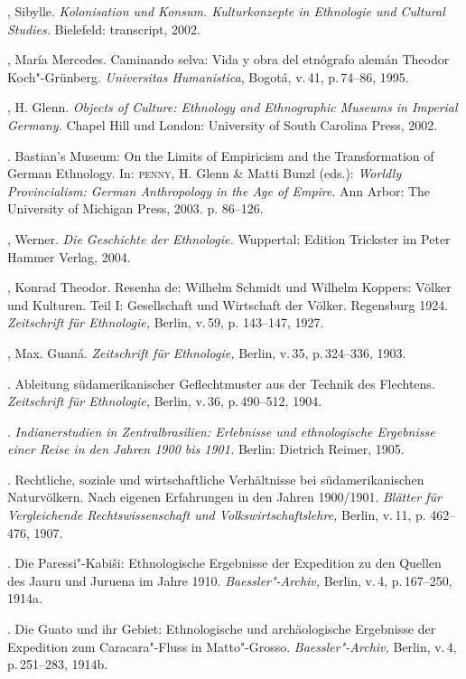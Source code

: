 \begin{bibliohedra}
 , Sibylle. \textit{Kolonisation und Konsum. Kulturkonzepte in
 Ethnologie und Cultural Studies.} Bielefeld: transcript, 2002.

 , María Mercedes. Caminando selva: Vida y obra del
 etnógrafo alemán Theodor Koch"-Grünberg. \textit{Universitas
 Humanistica}, Bogotá, v.\,41, p.\,74--86, 1995.

 , H. Glenn. \textit{Objects of Culture: Ethnology and Ethnographic
 Museums in Imperial Germany.} Chapel Hill und London: University of
 South Carolina Press, 2002.

 \titidem. Bastian's Museum: On the Limits of Empiricism and
 the Transformation of German Ethnology. In: \textsc{penny}, H. Glenn \& Matti
 Bunzl (eds.): \textit{Worldly Provincialism: German Anthropology in the
 Age of Empire}. Ann Arbor: The University of Michigan Press, 2003. p.
 86--126.

 , Werner. \textit{Die Geschichte der Ethnologie.} Wuppertal:
 Edition Trickster im Peter Hammer Verlag, 2004.

 , Konrad Theodor. Resenha de: Wilhelm Schmidt und Wilhelm Koppers:
 Völker und Kulturen. Teil I: Gesellschaft und Wirtschaft der Völker.
 Regensburg 1924. \textit{Zeitschrift für Ethnologie,} Berlin, v.\,59, p.
 143--147, 1927.

 , Max. Guaná. \textit{Zeitschrift für Ethnologie,} Berlin, v.\,35,
 p.\,324--336, 1903.

 \titidem. Ableitung südamerikanischer Geflechtmuster aus der
 Technik des Flechtens. \textit{Zeitschrift für Ethnologie,} Berlin, v.\,36, p.\,490--512, 1904.

 \titidem. \textit{Indianerstudien in Zentralbrasilien:
 Erlebnisse und ethnologische Ergebnisse einer Reise in den Jahren 1900
 bis 1901.} Berlin: Dietrich Reimer, 1905.

 \titidem. Rechtliche, soziale und wirtschaftliche
 Verhältnisse bei südamerikanischen Naturvölkern. Nach eigenen
 Erfahrungen in den Jahren 1900/1901. \textit{Blätter für Vergleichende
 Rechtswissenschaft und Volkswirtschaftslehre,} Berlin, v.\,11, p.
 462--476, 1907.

 \titidem. Die Paressi"-Kabiši: Ethnologische Ergebnisse der
 Expedition zu den Quellen des Jauru und Juruena im Jahre 1910.
 \textit{Baessler"-Archiv,} Berlin, v.\,4, p.\,167--250, 1914a.

 \titidem. Die Guato und ihr Gebiet: Ethnologische und
 archäologische Ergebnisse der Expedition zum Caracara"-Fluss in
 Matto"-Grosso. \textit{Baessler"-Archiv,} Berlin, v.\,4, p.\,251--283, 1914b.


\end{bibliohedra}
